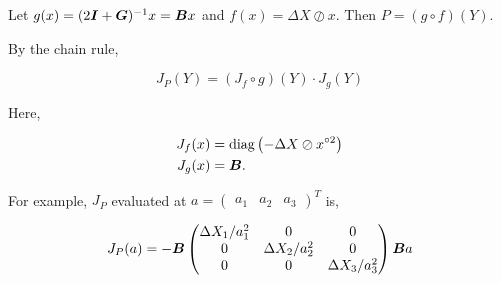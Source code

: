 \documentclass[american]{scrartcl}
\newcommand{\matr}[1]{\bm{#1}}
\newcommand{\diag}{\text{diag}}
\begin{document}
	Let $g(x) = (2\matr{I} + \matr{G})^{-1} x = \B x$ and $f(x) = \Delta X \oslash x$. Then $P = (g \circ f)(Y)$.

	By the chain rule,

	\begin{equation}
		J_P(Y) = (J_f \circ g)(Y) \cdot J_g(Y)
	\end{equation}

	Here,

	\begin{equation}
		\begin{split}
			J_f(x) &= \diag\left( - \Delta X \oslash x^{\circ 2} \right) \\
			J_g(x) &= \B.
		\end{split}
	\end{equation}

	For example, $J_P$ evaluated at $a = \begin{pmatrix}
			a_1 & a_2 & a_3
		\end{pmatrix}^T$ is,

	\begin{equation}
		J_P(a) = - \B \begin{pmatrix}
			\Delta X_1 / a_1^2 & 0                  & 0                  \\
			0                  & \Delta X_2 / a_2^2 & 0                  \\
			0                  & 0                  & \Delta X_3 / a_3^2
		\end{pmatrix} \B a
	\end{equation}

\fi
\end{document}
